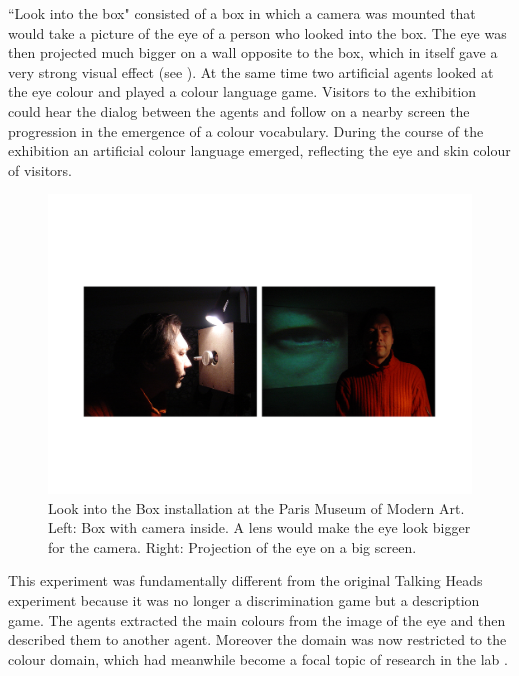 ``Look into the box" consisted of a box in which a camera was mounted that would take a picture of the 
eye of a person who looked into the box. The eye was then projected much bigger on a wall opposite to the box, 
which in itself gave a very strong visual effect (see ). 
At the same time two artificial agents looked at the 
eye colour and played a colour language game. Visitors to the exhibition could hear the dialog between the agents 
and follow on a nearby screen the progression in the emergence of a colour vocabulary. During the course of the 
exhibition an artificial colour language emerged, reflecting the eye and skin colour of visitors. 

\begin{figure}[htbp]
  \centerline{\includegraphics[width=.95\textwidth]{chap9/figs/look-into-box.pdf}}
\caption{\label{fig:lookintobox}Look into the Box installation at the Paris Museum of Modern Art. Left: Box with camera inside. A lens would make 
the eye look bigger for the camera. Right: Projection of the eye on a big screen.}
\end{figure}

This experiment was fundamentally 
different from the original Talking Heads experiment because it was no longer a discrimination game
but a description game. The agents extracted the main colours from the image of the eye and then described them to 
another agent. Moreover the domain was now restricted to the colour domain, which had meanwhile 
become a focal topic of research in the lab \citep{Steels:2005}. 

